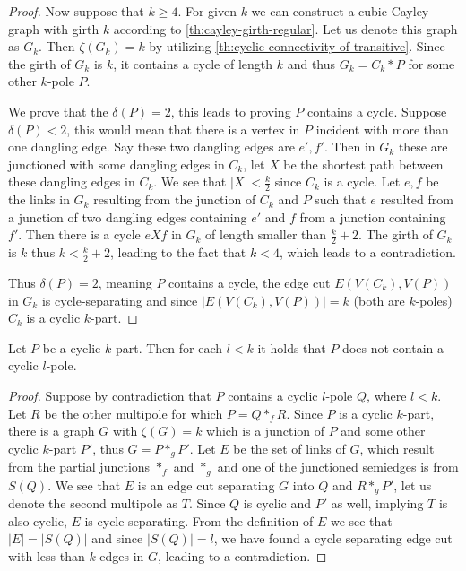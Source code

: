 \documentclass[12pt, twoside]{book}
\begin{document}
\begin{proof}
	Now suppose that $k\geq 4$. For given $k$ we can construct a cubic Cayley graph with girth $k$ according to \cref{th:cayley-girth-regular}. Let us denote this graph as $G_k$. Then $\zeta(G_k)=k$ by utilizing \cref{th:cyclic-connectivity-of-transitive}. Since the girth of $G_k$ is $k$, it contains a cycle of length $k$ and thus $G_k=C_k*P$ for some other $k$-pole $P$.
	
	We prove that the $\delta(P)=2$, this leads to proving $P$ contains a cycle. Suppose $\delta(P)<2$, this would mean that there is a vertex in $P$ incident with more than one dangling edge. Say these two dangling edges are $e',f'$. Then in $G_k$ these are junctioned with some dangling edges in $C_k$, let $X$ be the shortest path between these dangling edges in $C_k$. We see that $|X|<\frac{k}{2}$ since $C_k$ is a cycle. Let $e,f$ be the links in $G_k$ resulting from the junction of $C_k$ and $P$ such that $e$ resulted from a junction of two dangling edges containing $e'$ and $f$ from a junction containing $f'$. Then there is a cycle $eXf$ in $G_k$ of length smaller than $\frac{k}{2}+2$. The girth of $G_k$ is $k$ thus $k<\frac{k}{2}+2$, leading to the fact that $k<4$, which leads to a contradiction. 
	
	Thus $\delta(P)=2$, meaning $P$ contains a cycle, the edge cut $E(V(C_k), V(P))$ in $G_k$ is cycle-separating and since $|E(V(C_k), V(P))|=k$ (both are $k$-poles) $C_k$ is a cyclic $k$-part.
\end{proof}

\begin{lemma}\label{lem:cyclic-part-no-small-cyclic-l-pole}
	Let $P$ be a cyclic $k$-part. Then for each $l<k$ it holds that $P$ does not contain a cyclic $l$-pole. 
\end{lemma}

\begin{proof}
	Suppose by contradiction that $P$ contains a cyclic $l$-pole $Q$, where $l<k$. Let $R$ be the other multipole for which $P=Q*_fR$. Since $P$ is a cyclic $k$-part, there is a graph $G$ with $\zeta(G)=k$ which is a junction of $P$ and some other cyclic $k$-part $P'$, thus $G=P*_gP'$. Let $E$ be the set of links of $G$, which result from the partial junctions $*_f$ and $*_g$ and one of the junctioned semiedges is from $S(Q)$. We see that $E$ is an edge cut separating $G$ into $Q$ and $R*_gP'$, let us denote the second multipole as $T$. Since $Q$ is cyclic and $P'$ as well, implying $T$ is also cyclic, $E$ is cycle separating. From the definition of $E$ we see that $|E|=|S(Q)|$ and since $|S(Q)|=l$, we have found a cycle separating edge cut with less than $k$ edges in $G$, leading to a contradiction.
\end{proof}
\end{document}
